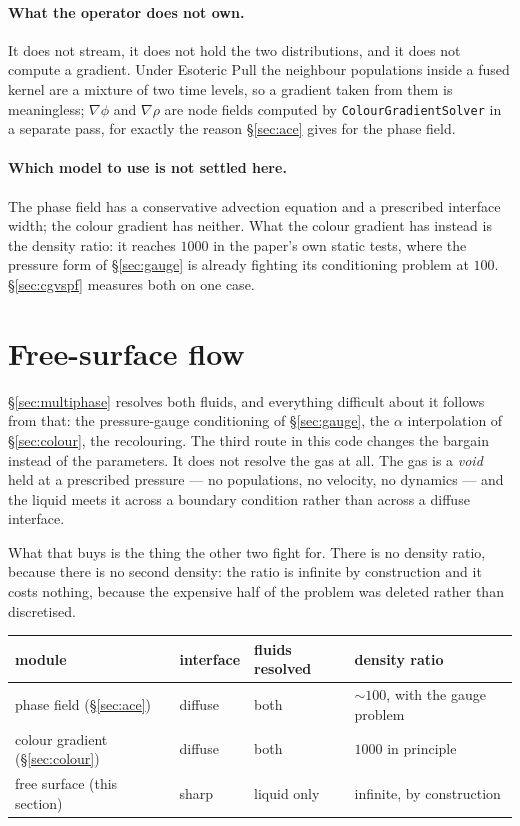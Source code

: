 \documentclass[11pt,a4paper]{article}
\newcommand{\code}[1]{\texttt{\small #1}}
\begin{document}
\paragraph{What the operator does not own.} It does not stream, it does not hold
the two distributions, and it does not compute a gradient. Under Esoteric Pull
the neighbour populations inside a fused kernel are a mixture of two time
levels, so a gradient taken from them is meaningless; $\nabla\phi$ and
$\nabla\rho$ are node fields computed by \code{ColourGradientSolver} in a
separate pass, for exactly the reason \S\ref{sec:ace} gives for the phase field.

\paragraph{Which model to use is not settled here.} The phase field has a
conservative advection equation and a prescribed interface width; the colour
gradient has neither. What the colour gradient has instead is the density ratio:
it reaches $1000$ in the paper's own static tests, where the pressure form of
\S\ref{sec:gauge} is already fighting its conditioning problem at $100$.
\S\ref{sec:cgvspf} measures both on one case.

\section{Free-surface flow}
\label{sec:freesurface}

\S\ref{sec:multiphase} resolves both fluids, and everything difficult about it
follows from that: the pressure-gauge conditioning of \S\ref{sec:gauge}, the
$\alpha$ interpolation of \S\ref{sec:colour}, the recolouring. The third route
in this code changes the bargain instead of the parameters. It does not resolve
the gas at all. The gas is a \emph{void} held at a prescribed pressure --- no
populations, no velocity, no dynamics --- and the liquid meets it across a
boundary condition rather than across a diffuse interface.

What that buys is the thing the other two fight for. There is no density ratio,
because there is no second density: the ratio is infinite by construction and it
costs nothing, because the expensive half of the problem was deleted rather than
discretised.

\begin{center}
\begin{tabular}{llll}
\toprule
module & interface & fluids resolved & density ratio \\
\midrule
phase field (\S\ref{sec:ace}) & diffuse & both & $\sim 100$, with the gauge problem \\
colour gradient (\S\ref{sec:colour}) & diffuse & both & $1000$ in principle \\
free surface (this section) & sharp & liquid only & infinite, by construction \\
\bottomrule
\end{tabular}
\end{center}
\end{document}
